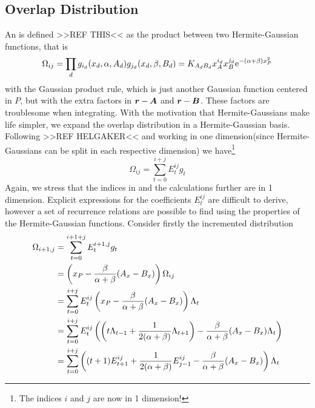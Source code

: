 \subsection{Overlap Distribution}
    An  is defined >>REF THIS<< as the product
    between two Hermite-Gaussian functions, that is
        \begin{equation}
            \Omega_{ij} = \prod_d g_{i_d}(x_d,\alpha,A_d)g_{j_d}(x_d,\beta,B_d)
            =
            K_{A_dB_d}x_A^{i_d}x_B^{j_d}\mathrm{e}^{-(\alpha+\beta)x^2_P}
        \end{equation}
    with the Gaussian product rule, which is just another Gaussian function
    centered in $P$, but with the extra  factors in
    $\boldsymbol{{r}}-\boldsymbol{{A}}$ and $\boldsymbol{{r}}-\boldsymbol{{B}}$. These factors are troublesome
    when integrating. With the motivation that Hermite-Gaussians make life
    simpler, we expand the overlap distribution in a Hermite-Gaussian basis.
    Following >>REF HELGAKER<< and working in one dimension(since
    Hermite-Gaussians can be split in each respective dimension) we
    have\footnote{The indices $i$ and $j$ are now in 1 dimension!}
        \begin{equation}
            \Omega_{ij} = \sum\limits^{i+j}_{t=0} E^{ij}_tg_t
            \label{eq:omegaDef}
        \end{equation}
    Again, we stress that the indices in  and the calculations
    further are in 1 dimension. Explicit expressions for the coefficients
    $E^{ij}_t$ are difficult to derive, however a set of recurrence relations
    are possible to find using the properties of the Hermite-Gaussian
    functions. Consider firstly the incremented distribution
        \begin{align}
            \Omega_{i+1,j} &= \sum^{i+1+j}_{t=0} E^{i+1,j}_tg_t \nonumber \\
            &= \left(x_P -
            \frac{\beta}{\alpha+\beta}(A_x-B_x)\right)\Omega_{ij}
            \nonumber \\
            &= \suml{t=0}{i+j} E^{ij}_t\left(x_P -
            \frac{\beta}{\alpha+\beta}(A_x-B_x)\right) \Lambda_t \nonumber \\
            &= \suml{t=0}{i+j} E^{ij}_t\left(\left(t\Lambda_{t-1} +
            \frac{1}{2(\alpha+\beta)}\Lambda_{t+1}\right) -
            \frac{\beta}{\alpha+\beta}(A_x-B_x)\Lambda_t\right) \nonumber \\
            &= \suml{t=0}{i+j} \left((t+1)E^{ij}_{t+1} +
            \frac{1}{2(\alpha+\beta)}E^{ij}_{j-1} -
            \frac{\beta}{\alpha+\beta}(A_x-B_x)\right)\Lambda_t
            \label{eq:omegaIncr}
        \end{align}
